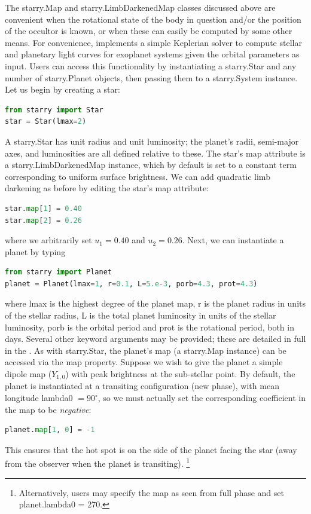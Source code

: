 \documentclass[modern]{aastex61}
\begin{document}
The \textsf{starry.Map} and \textsf{starry.LimbDarkenedMap} classes
discussed above are convenient when the rotational
state of the body in question and/or the position of the occultor is known,
or when these can easily be computed by some other means. For convenience,
\starry implements a simple Keplerian solver to compute stellar and
planetary light curves for exoplanet systems given the orbital parameters as
input. Users can access this functionality by instantiating a
\textsf{starry.Star} and any number of \textsf{starry.Planet} objects, then
passing them to a \textsf{starry.System} instance. Let us begin by
creating a star:
%
\begin{lstlisting}[language=Python,firstnumber=last]
from starry import Star
star = Star(lmax=2)
\end{lstlisting}
%
A \textsf{starry.Star} has unit radius and unit luminosity; the planet's radii,
semi-major axes, and luminosities are all defined relative to these.
The star's \textsf{map} attribute is a \textsf{starry.LimbDarkenedMap} instance,
which by default is set to a constant term corresponding to uniform surface brightness.
We can add quadratic limb darkening as before by editing the star's \textsf{map}
attribute:
%
\begin{lstlisting}[language=Python,firstnumber=last,]
star.map[1] = 0.40
star.map[2] = 0.26
\end{lstlisting}
%
where we arbitrarily set $u_1 = 0.40$ and $u_2 = 0.26$.
Next, we can instantiate a planet by typing
%
\begin{lstlisting}[language=Python,firstnumber=last]
from starry import Planet
planet = Planet(lmax=1, r=0.1, L=5.e-3, porb=4.3, prot=4.3)
\end{lstlisting}
%
where \textsf{lmax} is the highest degree of the planet map, \textsf{r} is the
planet radius in units of the stellar radius, \textsf{L} is the total planet luminosity
in units of the stellar luminosity,
\textsf{porb} is the orbital period and \textsf{prot} is the rotational
period, both in days.
Several other keyword arguments may be provided; these are detailed in full
in the \docs. As with \textsf{starry.Star}, the planet's map
(a \textsf{starry.Map} instance) can be accessed
via the \textsf{map} property. Suppose we wish to give the planet a simple
dipole map ($Y_{1,0}$) with peak brightness at the sub-stellar point.
By default, the planet is instantiated at a transiting configuration (new phase),
with mean longitude \textsf{lambda0} $= 90^\circ$, so we must actually set
the corresponding coefficient in the map to be \emph{negative}:
%
\begin{lstlisting}[language=Python,firstnumber=last]
planet.map[1, 0] = -1
\end{lstlisting}
%
This ensures that the hot spot is on the side of the planet facing the star
(away from the observer when the planet is transiting).
\footnote{Alternatively, users may specify the map as seen from full phase and
set \textsf{planet.lambda0 = 270}.}
%
\end{document}
